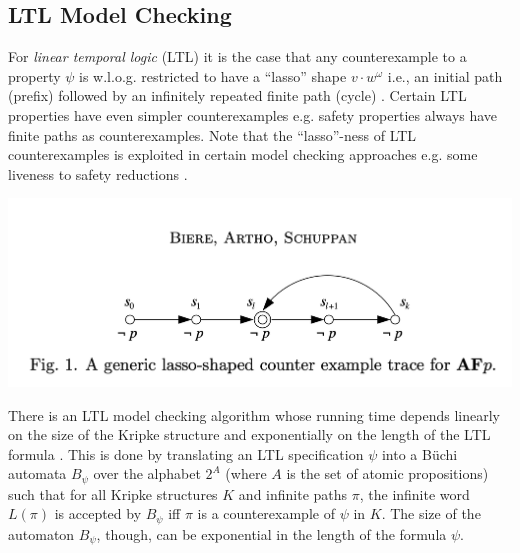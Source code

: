 \documentclass[10pt,a4paper]{article}
\begin{document}
\subsection*{LTL Model Checking}

For \textit{linear temporal logic} (LTL) it is the case that any counterexample to a property $\psi$ is w.l.o.g. restricted to have a ``lasso'' shape $v\cdot w^{\omega}$ i.e., an initial path (prefix) followed by an infinitely repeated finite path (cycle) \cite{1983wolpervardi}. Certain LTL properties have even simpler counterexamples e.g. safety properties always have finite paths as counterexamples. Note that the ``lasso''-ness of LTL counterexamples is exploited in certain model checking approaches e.g. some liveness to safety reductions \cite{BIERE2002160}.

\begin{center}
    \includegraphics[scale=0.3]{images/ltl-lasso.png}
\end{center}

There is an LTL model checking algorithm whose running time depends linearly on the size of the Kripke structure and exponentially on the length of the LTL formula \cite{1985pnuelilich}. This is done by translating an LTL specification $\psi$ into a B{\"u}chi automata $B_{\psi}$ over the alphabet $2^A$ (where $A$ is the set of atomic propositions) such that for all Kripke structures $K$ and infinite paths $\pi$, the infinite word $L(\pi)$ is accepted by $B_{\psi}$ iff $\pi$ is a counterexample of $\psi$ in $K$. The size of the automaton $B_{\psi}$, though, can be exponential in the length of the formula $\psi$. 
\end{document}
